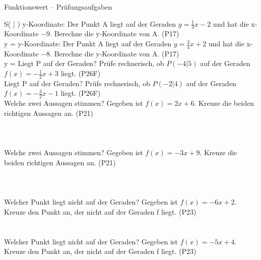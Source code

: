 \begin{aufgabe}{Funktionswert – Prüfungsaufgaben}
\begin{teile}
\begin{ksys}[xmin=-5,xmax=5,ymin=-6,ymax=8]  \end{ksys}
S( \leerfeld | \leerfeld ) \quad \janein
\teil y-Koordinate: Der Punkt A liegt auf der Geraden $y = \frac{1}{3}x - 2$ und hat die x-Koordinate $-9$. Berechne die y-Koordinate von A. \hfill (P17) \\ y = \leerfeld
\teil y-Koordinate: Der Punkt A liegt auf der Geraden $y = \frac{3}{4}x + 2$ und hat die x-Koordinate $-8$. Berechne die y-Koordinate von A. \hfill (P17) \\ y = \leerfeld
\teil Liegt P auf der Geraden? Prüfe rechnerisch, ob $P(-4|5)$ auf der Geraden $f(x) = -\frac{1}{2}x + 3$ liegt. \hfill (P26F) \\ \janein
\teil Liegt P auf der Geraden? Prüfe rechnerisch, ob $P(-2|4)$ auf der Geraden $f(x) = -\frac{3}{2}x - 1$ liegt. \hfill (P26F) \\ \janein
\teil Welche zwei Aussagen stimmen? Gegeben ist $f(x) = 2x + 6$. Kreuze die beiden richtigen Aussagen an. \hfill (P21) \\  \\  \\  \\ 
\teil Welche zwei Aussagen stimmen? Gegeben ist $f(x) = -3x + 9$. Kreuze die beiden richtigen Aussagen an. \hfill (P21) \\  \\  \\  \\ 
\teil Welcher Punkt liegt nicht auf der Geraden? Gegeben ist $f(x) = -6x + 2$. Kreuze den Punkt an, der nicht auf der Geraden f liegt. \hfill (P23) \\  \\  \\ 
\teil Welcher Punkt liegt nicht auf der Geraden? Gegeben ist $f(x) = -5x + 4$. Kreuze den Punkt an, der nicht auf der Geraden f liegt. \hfill (P23) \\  \\  \\ 
\end{teile}
\end{aufgabe}

\medskip
{}
